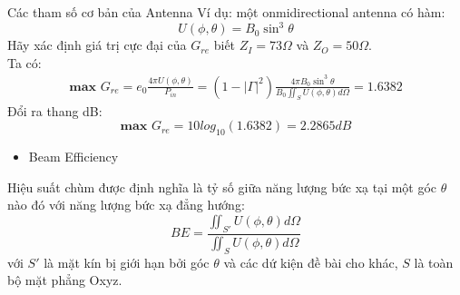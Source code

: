 \documentclass[8pt]{beamer}
\begin{document}
\begin{frame}{Các tham số cơ bản của Antenna}
Ví dụ: một onmidirectional antenna có hàm: $$U(\phi,\theta)=B_{0}\sin^3{\theta}$$
Hãy xác định giá trị cực đại của $G_{re}$ biết $Z_{I}=73\Omega$ và $Z_{O}=50\Omega$.
\\  Ta có:
\begin{equation*}
\begin{split}
	\textbf{max }G_{re}=e_{0}\frac{4\pi U(\phi,\theta)}{P_{in}}=(1-|\Gamma|^2)\frac{4\pi B_{0}\sin^3{\theta}}{B_{0}\iint_{S}U(\phi,\theta)d\Omega}=1.6382
\end{split}
\end{equation*}
Đổi ra thang dB: $$\textbf{max }G_{re}=10log_{10}(1.6382)=2.2865dB$$
\begin{itemize}
	\item  Beam Efficiency
\end{itemize}
 Hiệu suất chùm được định nghĩa là tỷ số giữa năng lượng bức xạ tại một góc $\theta$ nào đó với năng lượng bức xạ đẳng hướng:
 $$BE=\frac{\iint_{S'}U(\phi,\theta)d\Omega}{\iint_{S}U(\phi,\theta)d\Omega}$$
 với $S'$ là mặt kín bị giới hạn bởi góc $\theta$ và các dứ kiện đề bài cho khác, $S$ là toàn bộ mặt phẳng Oxyz.
\end{frame}
\end{document}
